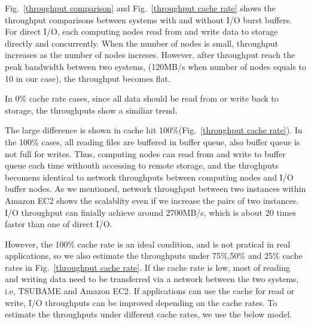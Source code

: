 Fig.~\ref{throughput comparison} and Fig.~\ref{throughput cache rate} shows the throughput comparisons between systems  with and without I/O burst buffers.
For direct I/O, each computing nodes read from and write data to storage directly and concurrently.
When the number of nodes is small, throughput increases as the number of nodes increses.
However, after throughput reach the peak bandwidth between two systems, (120MB/s when number of nodes equals to 10 in our case), 
the throughput becomes flat. %

In 0\% cache rate cases, since all data should be read from or write back to storage, 
the throughputs show a similiar trend.%

The large difference is shown in cache hit 100\%(Fig.~\ref{throughput cache rate}).
In the 100\% cases, all reading files are buffered in buffer queue, 
also buffer queue is not full for writes.
Thus, computing nodes can read from and write to buffer queue each time withouth accessing to remote storage, 
and the throghputs becomens identical to network throughputs between computing nodes and I/O buffer nodes.
As we mentioned, network throughput between two instances within Amazon EC2 shows the scalablity even if we increase the pairs of two instances.
I/O throughput can finially achieve around 2700MB/s, which is about 20 times faster than one of direct I/O.%

However, the 100\% cache rate is an ideal condition, and is not pratical in real applications, 
so we also estimate the throughputs under 75\%,50\% and 25\% cache rates in Fig.~\ref{throughput cache rate}.
If the cache rate is low, most of reading and writing data need to be transferred via a network between the two systems, i.e, TSUBAME and Amazon EC2.
If applications can use the cache for read or write, I/O throughputs can be improved depending on the cache rates.
To estimate the throughputs under different cache rates, we use the below model.
 
